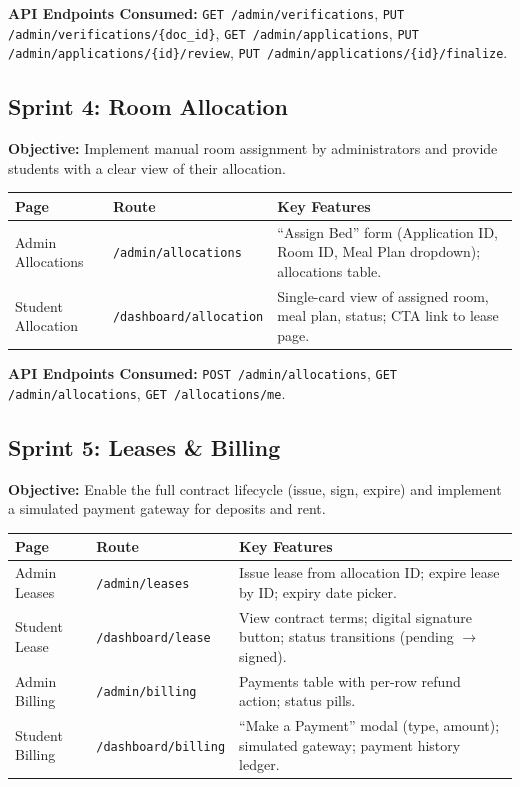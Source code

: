 \documentclass[12pt,a4paper]{article}
\begin{document}
\textbf{API Endpoints Consumed:} \texttt{GET /admin/verifications}, \texttt{PUT /admin/verifications/\{doc\_id\}}, \texttt{GET /admin/applications}, \texttt{PUT /admin/applications/\{id\}/review}, \texttt{PUT /admin/applications/\{id\}/finalize}.


\subsection{Sprint 4: Room Allocation}

\textbf{Objective:} Implement manual room assignment by administrators and provide students with a clear view of their allocation.

\begin{longtable}{p{3.5cm}p{3.5cm}p{6cm}}
\toprule
\textbf{Page} & \textbf{Route} & \textbf{Key Features} \\
\midrule
Admin Allocations & \texttt{/admin/allocations} & ``Assign Bed'' form (Application ID, Room ID, Meal Plan dropdown); allocations table. \\
Student Allocation & \texttt{/dashboard/allocation} & Single-card view of assigned room, meal plan, status; CTA link to lease page. \\
\bottomrule
\end{longtable}

\textbf{API Endpoints Consumed:} \texttt{POST /admin/allocations}, \texttt{GET /admin/allocations}, \texttt{GET /allocations/me}.


\subsection{Sprint 5: Leases \& Billing}

\textbf{Objective:} Enable the full contract lifecycle (issue, sign, expire) and implement a simulated payment gateway for deposits and rent.

\begin{longtable}{p{3.5cm}p{3.5cm}p{6cm}}
\toprule
\textbf{Page} & \textbf{Route} & \textbf{Key Features} \\
\midrule
Admin Leases & \texttt{/admin/leases} & Issue lease from allocation ID; expire lease by ID; expiry date picker. \\
Student Lease & \texttt{/dashboard/lease} & View contract terms; digital signature button; status transitions (pending $\rightarrow$ signed). \\
Admin Billing & \texttt{/admin/billing} & Payments table with per-row refund action; status pills. \\
Student Billing & \texttt{/dashboard/billing} & ``Make a Payment'' modal (type, amount); simulated gateway; payment history ledger. \\
\bottomrule
\end{longtable}
\end{document}
